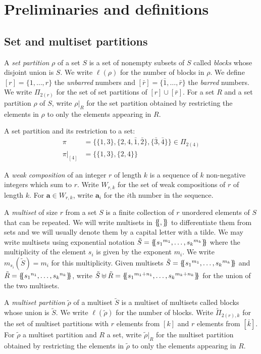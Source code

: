 \documentclass[ALCO,Unicode,published]{cedram}
\newcommand{\bfa}{{\boldsymbol{a}}}
\newcommand{\trho}{{\tilde{\rho}}}
\newcommand{\tS}{{\tilde{S}}}
\newcommand{\tR}{{\tilde{R}}}
\newcommand{\multi}[1]{\left\{\mskip-5mu\left\{#1\right\}\mskip-5mu\right\}}
\newcommand{\ov}[1]{\bar{#1}}
\newcommand{\ovb}[1]{\left[\ov{#1}\right]}
\newcommand{\defn}[1]{\textcolor{defncolor}{\emph{#1}}}
\begin{document}
\section{Preliminaries and definitions}\label{sec:prelim}

\subsection{Set and multiset partitions}

A \defn{set partition} $\rho$ of a set $S$ is a set of nonempty subsets of $S$ called \defn{blocks} whose disjoint union is $S$. We write $\ell(\rho)$ for the number of blocks in $\rho$. We define $[r]=\{1,\dots,r\}$ the \defn{unbarred} numbers and $\ovb{r}=\{\ov1,\dots,\ov r\}$ the \defn{barred} numbers. We write $\Pi_{2(r)}$ for the set of set partitions of $[r]\cup\ovb{r}$. For a set $R$ and a set partition $\rho$ of $S$, write $\rho|_R$ for the set partition obtained by restricting the elements in $\rho$ to only the elements appearing in $R$.

\begin{exam} A set partition and its restriction to a set:
    \begin{align*}
        \pi&=\{\{1,3\},\{2,4,\ov1,\ov2\},\{\ov3,\ov4\}\}\in\Pi_{2(4)}\\
        \pi|_{[4]}&=\{\{1,3\},\{2,4\}\}
    \end{align*}
\end{exam}

A \defn{weak composition} of an integer $r$ of length $k$ is a sequence of $k$ non-negative integers which sum to $r$. Write $W_{r,k}$ for the set of weak compositions of $r$ of length $k$. For $\bfa\in W_{r,k}$, write $\bfa_i$ for the $i$th number in the sequence.

A \defn{multiset} of size $r$ from a set $S$ is a finite collection of $r$ unordered elements of $S$ that can be repeated. We will write multisets in $\multi{,}$ to differentiate them from sets and we will usually denote them by a capital letter with a tilde. We may write multisets using exponential notation $\tS=\multi{{s_1}^{m_1},\dots,{s_k}^{m_k}}$ where the multiplicity of the element $s_i$ is given by the exponent $m_i$. We write $m_{s_i}(\tS)=m_i$ for this multiplicity. Given multisets $\tS=\multi{{s_1}^{m_1},\dots,{s_k}^{m_k}}$ and $\tR=\multi{{s_1}^{n_1},\dots,{s_k}^{n_k}}$, write $\tS\uplus\tR=\multi{{s_1}^{m_1+n_1},\dots,{s_k}^{m_k+n_k}}$ for the union of the two multisets.

A \defn{multiset partition} $\tilde\rho$ of a multiset $\tS$ is a multiset of multisets called blocks whose union is $\tS$. We write $\ell(\tilde\rho)$ for the number of blocks. Write $\tilde\Pi_{2(r),k}$ for the set of multiset partitions with $r$ elements from $[k]$ and $r$ elements from $\ovb{k}$. For $\trho$ a multiset partition and $R$ a set, write $\trho|_{R}$ for the multiset partition obtained by restricting the elements in $\trho$ to only the elements appearing in $R$. 
\end{document}
